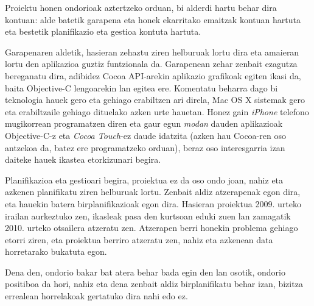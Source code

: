 Proiektu honen ondorioak aztertzeko orduan, bi alderdi hartu behar dira kontuan: alde batetik garapena eta honek ekarritako emaitzak kontuan hartuta eta bestetik planifikazio eta gestioa kontuta hartuta.

Garapenaren aldetik, hasieran zehaztu ziren helburuak lortu dira eta amaieran lortu den aplikazioa guztiz funtzionala da. Garapenean zehar zenbait ezagutza bereganatu dira, adibidez Cocoa API-arekin aplikazio grafikoak egiten ikasi da, baita Objective-C lengoarekin lan egitea ere. Komentatu beharra dago bi teknologia hauek gero eta gehiago erabiltzen ari direla, Mac OS X sistemak gero eta erabiltzaile gehiago dituelako azken urte hauetan. Honez gain \textit{iPhone} telefono mugikorrean programatzen diren eta gaur egun \textit{modan} dauden aplikazioak Objective-C-z eta \textit{Cocoa Touch}-ez daude idatzita (azken hau Cocoa-ren oso antzekoa da, batez ere programatzeko orduan), beraz oso interesgarria izan daiteke hauek ikastea etorkizunari begira.

Planifikazioa eta gestioari begira, proiektua ez da oso ondo joan, nahiz eta azkenen planifikatu ziren helburuak lortu. Zenbait aldiz atzerapenak egon dira, eta hauekin batera birplanifikazioak egon dira. Hasieran proiektua 2009. urteko irailan aurkeztuko zen, ikasleak pasa den kurtsoan eduki zuen lan zamagatik 2010. urteko otsailera atzeratu zen. Atzerapen berri honekin problema gehiago etorri ziren, eta proiektua berriro atzeratu zen, nahiz eta azkenean data horretarako bukatuta egon.

Dena den, ondorio bakar bat atera behar bada egin den lan osotik, ondorio positiboa da hori, nahiz eta dena zenbait aldiz birplanifikatu behar izan, bizitza errealean horrelakoak gertatuko dira nahi edo ez.
